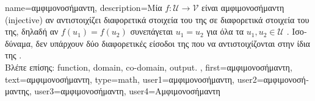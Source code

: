 {name={\foreignlanguage{greek}{αμφιμονοσήμαντη}}, 
	description={\foreignlanguage{greek}{Μία}  $f: \mathcal{U} \rightarrow \mathcal{V}$ \foreignlanguage{greek}{είναι 
		αμφιμονοσήμαντη} (injective) \foreignlanguage{greek}{αν αντιστοιχίζει διαφορετικά 
		στοιχεία του}  \foreignlanguage{greek}{της σε διαφορετικά στοιχεία του} 
		 \foreignlanguage{greek}{της, δηλαδή αν $f(u_1) = f(u_2)$ συνεπάγεται $u_1 = u_2$ για όλα τα}
		$u_1, u_2 \in \mathcal{U}$ \cite{HalmosSet}. 
    		\foreignlanguage{greek}{Ισοδύναμα, δεν υπάρχουν δύο διαφορετικές είσοδοι της}  \foreignlanguage{greek}{που 
		να αντιστοιχίζονται στην ίδια}  \foreignlanguage{greek}{της} .
				\\
		\foreignlanguage{greek}{Βλέπε επίσης:} \gls{function}, \gls{domain}, \gls{co-domain}, \gls{output}. },
	first={\foreignlanguage{greek}{αμφιμονοσήμαντη}},
	text={\foreignlanguage{greek}{αμφιμονοσήμαντη}},
	type=math,
	user1={\foreignlanguage{greek}{αμφιμονοσήμαντη}}, %
	user2={\foreignlanguage{greek}{αμφιμονοσήμαντης}}, %
	user3={\foreignlanguage{greek}{αμφιμονοσήμαντη}}, %
	user4={\foreignlanguage{greek}{Αμφιμονοσήμαντη}} %
}%

